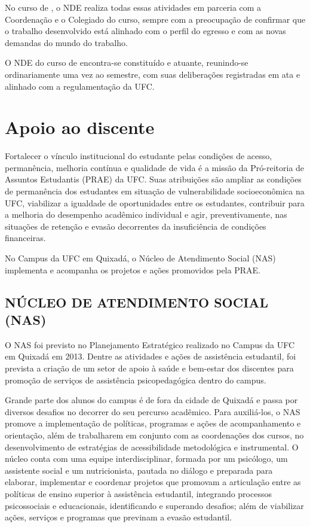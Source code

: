 No curso de \nomedocurso, o NDE realiza todas essas atividades em parceria com a Coordenação e o Colegiado do curso, sempre com a preocupação de confirmar que o trabalho desenvolvido está alinhado com o perfil do egresso e com as novas demandas do mundo do trabalho.

O NDE do curso de \nomedocurso encontra-se constituído e atuante, reunindo-se ordinariamente uma vez ao semestre, com suas deliberações registradas em ata e alinhado com a regulamentação da UFC.


\section{Apoio ao discente}
Fortalecer o vínculo institucional do estudante pelas condições de acesso, permanência, melhoria contínua e qualidade de vida é a missão da Pró-reitoria de Assuntos Estudantis (PRAE) da UFC. Suas atribuições são ampliar as condições de permanência dos estudantes em situação de vulnerabilidade socioeconômica na UFC, viabilizar a igualdade de oportunidades entre os estudantes, contribuir para a melhoria do desempenho acadêmico individual e agir, preventivamente, nas situações de retenção e evasão decorrentes da insuficiência de condições financeiras.

No Campus da UFC em Quixadá, o Núcleo de Atendimento Social (NAS) implementa e acompanha os projetos e ações promovidos pela PRAE.

\subsection{NÚCLEO DE ATENDIMENTO SOCIAL (NAS)}
\label{sec:NAS}

O NAS foi previsto no Planejamento Estratégico realizado no Campus da UFC em Quixadá em 2013. Dentre as atividades e ações de assistência estudantil, foi prevista a criação de um setor de apoio à saúde e bem-estar dos discentes para promoção de serviços de assistência psicopedagógica dentro do campus.

Grande parte dos alunos do campus é de fora da cidade de Quixadá e passa por diversos desafios no decorrer do seu percurso acadêmico. Para auxiliá-los, o NAS promove a implementação de políticas, programas e ações de acompanhamento e orientação, além de trabalharem em conjunto com as coordenações dos cursos, no desenvolvimento de estratégias de acessibilidade metodológica e instrumental. O núcleo conta com uma equipe interdisciplinar, formada por um psicólogo, um assistente social e um nutricionista, pautada no diálogo e preparada para elaborar, implementar e coordenar projetos que promovam a articulação entre as políticas de ensino superior à assistência estudantil, integrando processos psicossociais e educacionais, identificando e superando desafios; além de viabilizar ações, serviços e programas que previnam a evasão estudantil.

